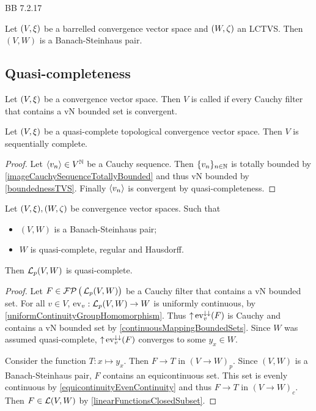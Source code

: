 \begin{theorem}
BB 7.2.17
\end{theorem}
\begin{corollary}
Let $\sSet{V,\xi}$ be a barrelled convergence vector space and $\sSet{W,\zeta}$ an LCTVS. Then $(V,W)$ is a Banach-Steinhaus pair.
\end{corollary}

\subsection{Quasi-completeness}
\begin{definition}
Let $\sSet{V,\xi}$ be a convergence vector space. Then $V$ is called  if every Cauchy filter that contains a vN bounded set is convergent.
\end{definition}

\begin{proposition} \label{quasiCompleteImpliesSequentiallyComplete}
Let $\sSet{V,\xi}$ be a quasi-complete topological convergence vector space. Then $V$ is sequentially complete.
\end{proposition}
\begin{proof}
Let $\left\langle v_n \right\rangle\in V^{\mathbb{N}}$ be a Cauchy sequence. Then $\{v_n\}_{n\in\mathbb{N}}$ is totally bounded by \ref{imageCauchySequenceTotallyBounded} and thus vN bounded by \ref{boundednessTVS}. Finally $\left\langle v_n \right\rangle$ is convergent by quasi-completeness.
\end{proof}

\begin{proposition} \label{quasiCompletenessFunctionSpaces}
Let $\sSet{V,\xi}, \sSet{W,\zeta}$ be convergence vector spaces. Such that
\begin{itemize}
\item $(V,W)$ is a Banach-Steinhaus pair;
\item $W$ is quasi-complete, regular and Hausdorff.
\end{itemize}
Then $\operatorname{\mathcal{L}}_p(V,W)$ is quasi-complete.
\end{proposition}
\begin{proof}
Let $F\in \operatorname{\mathcal{FP}}\big(\operatorname{\mathcal{L}}_p(V,W)\big)$ be a Cauchy filter that contains a vN bounded set. For all $v\in V$, $\operatorname{ev}_{v}: \operatorname{\mathcal{L}}_p(V,W) \to W$ is uniformly continuous, by \ref{uniformContinuityGroupHomomorphism}. Thus $\operatorname{\uparrow} \operatorname{ev}_v^{\downarrow\downarrow}(F)$ is Cauchy and contains a vN bounded set by \ref{continuousMappingBoundedSets}. Since $W$ was assumed quasi-complete, $\operatorname{\uparrow} \operatorname{ev}_v^{\downarrow\downarrow}(F)$ converges to some $y_x\in W$.

Consider the function $T: x\mapsto y_x$. Then $F\to T$ in $(V\to W)_p$. Since $(V,W)$ is a Banach-Steinhaus pair, $F$ contains an equicontinuous set. This set is evenly continuous by \ref{equicontinuityEvenContinuity} and thus $F\to T$ in $(V\to W)_c$. Then $F\in \operatorname{\mathcal{L}}(V,W)$ by \ref{linearFunctionsClosedSubset}.
\end{proof}

